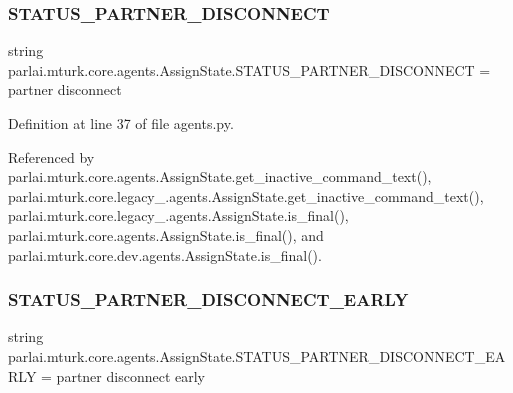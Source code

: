 \subsubsection{\texorpdfstring{S\+T\+A\+T\+U\+S\+\_\+\+P\+A\+R\+T\+N\+E\+R\+\_\+\+D\+I\+S\+C\+O\+N\+N\+E\+CT}{STATUS\_PARTNER\_DISCONNECT}}
{\footnotesize\ttfamily string parlai.\+mturk.\+core.\+agents.\+Assign\+State.\+S\+T\+A\+T\+U\+S\+\_\+\+P\+A\+R\+T\+N\+E\+R\+\_\+\+D\+I\+S\+C\+O\+N\+N\+E\+CT = \textquotesingle{}partner disconnect\textquotesingle{}\hspace{0.3cm}{\ttfamily [static]}}



Definition at line 37 of file agents.\+py.



Referenced by parlai.\+mturk.\+core.\+agents.\+Assign\+State.\+get\+\_\+inactive\+\_\+command\+\_\+text(), parlai.\+mturk.\+core.\+legacy\+\_.\+agents.\+Assign\+State.\+get\+\_\+inactive\+\_\+command\+\_\+text(), parlai.\+mturk.\+core.\+legacy\+\_.\+agents.\+Assign\+State.\+is\+\_\+final(), parlai.\+mturk.\+core.\+agents.\+Assign\+State.\+is\+\_\+final(), and parlai.\+mturk.\+core.\+dev.\+agents.\+Assign\+State.\+is\+\_\+final().

\mbox{\label{classparlai_1_1mturk_1_1core_1_1agents_1_1AssignState_ac62ca437e5cf0da61cb4e26de3913198}} 
\subsubsection{\texorpdfstring{S\+T\+A\+T\+U\+S\+\_\+\+P\+A\+R\+T\+N\+E\+R\+\_\+\+D\+I\+S\+C\+O\+N\+N\+E\+C\+T\+\_\+\+E\+A\+R\+LY}{STATUS\_PARTNER\_DISCONNECT\_EARLY}}
{\footnotesize\ttfamily string parlai.\+mturk.\+core.\+agents.\+Assign\+State.\+S\+T\+A\+T\+U\+S\+\_\+\+P\+A\+R\+T\+N\+E\+R\+\_\+\+D\+I\+S\+C\+O\+N\+N\+E\+C\+T\+\_\+\+E\+A\+R\+LY = \textquotesingle{}partner disconnect early\textquotesingle{}\hspace{0.3cm}{\ttfamily [static]}}



